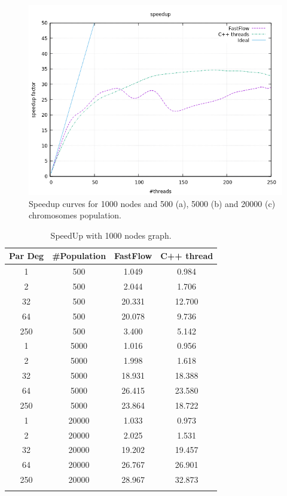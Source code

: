 \documentclass[a4paper,10pt]{article}
\begin{document}
\begin{figure}[H]
			\begin{minipage}[t]{0.32\linewidth}
				\includegraphics[width=\linewidth]{BenchMarkTSP/speedup/1000/SU100020000_zoom.png}
				\subcaption{}
			\end{minipage}
			\caption{Speedup curves for 1000 nodes and 500 (a), 5000 (b) and 20000 (c) chromosomes population.}
			\label{1000}
		\end{figure}

\begin{center}
	\small\addtolength{\tabcolsep}{5pt}
			\centering
	\begin{longtable}{|c|c|c|c|}
		\hline
		\textbf{Par Deg} & \textbf{\#Population} & \textbf{FastFlow} & \textbf{C++ thread}  \\ \hline
		1         &  500     & 1.049 &  0.984   \\ \hline
		2         &  500     & 2.044 &  1.706   \\ \hline
		32       &  500     & 20.331 &  12.700   \\ \hline
		64       &  500     & 20.078 &  9.736   \\ \hline
		250     &  500     & 3.400 &  5.142   \\ \hline
		1         &  5000   & 1.016 &  0.956   \\ \hline
		2         &  5000   & 1.998 &  1.618   \\ \hline
		32       &  5000   & 18.931 &  18.388   \\ \hline
		64       &  5000   & 26.415 &  23.580   \\ \hline
		250     &  5000   & 23.864 &  18.722   \\ \hline
		1         &  20000 & 1.033 &  0.973   \\ \hline
		2         &  20000 & 2.025 &  1.531   \\ \hline
		32       &  20000 & 19.202 &  19.457   \\ \hline
		64       &  20000 & 26.767 &  26.901   \\ \hline
		250     &  20000 & 28.967 &  32.873   \\ \hline				
		\caption{SpeedUp with 1000 nodes graph.}	
		\label{tab:dati1000}
	\end{longtable}	
\end{center}
\end{document}
